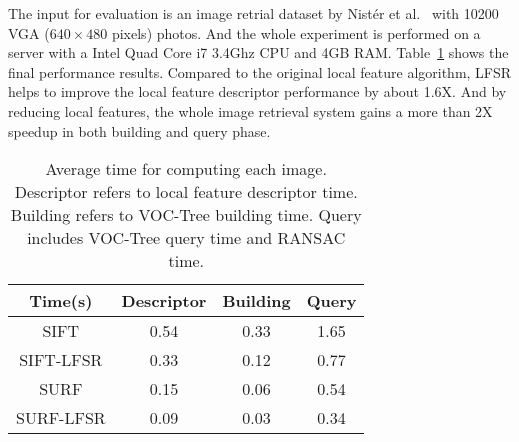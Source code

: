 The input for evaluation is an image retrial dataset by Nist\'er et al.~\cite{nister-stewenius-cvpr-2006} with 10200 VGA ($640\times480$ pixels) photos. And the whole experiment is performed on a server with a Intel Quad Core i7 3.4Ghz CPU and 4GB RAM. Table~\ref{tab:integration} shows the final performance results. Compared to the original local feature algorithm, LFSR helps to improve the local feature descriptor performance by about 1.6X. And by reducing local features, the whole image retrieval system gains a more than 2X speedup in both building and query phase.

\begin{table}
\begin{center}
\begin{tabular}{|c|c|c|c|}
\hline
Time(s) & Descriptor & Building & Query \\
\hline\hline
SIFT & 0.54 & 0.33 & 1.65 \\
SIFT-LFSR & 0.33 & 0.12 & 0.77 \\
\hline\hline
SURF & 0.15 & 0.06 & 0.54 \\
SURF-LFSR & 0.09 & 0.03 & 0.34 \\
\hline
\end{tabular}
\end{center}
\caption{Average time for computing each image. Descriptor refers to local feature descriptor time. Building refers to VOC-Tree building time. Query includes VOC-Tree query time and RANSAC time.}
\label{tab:integration}
\end{table}
